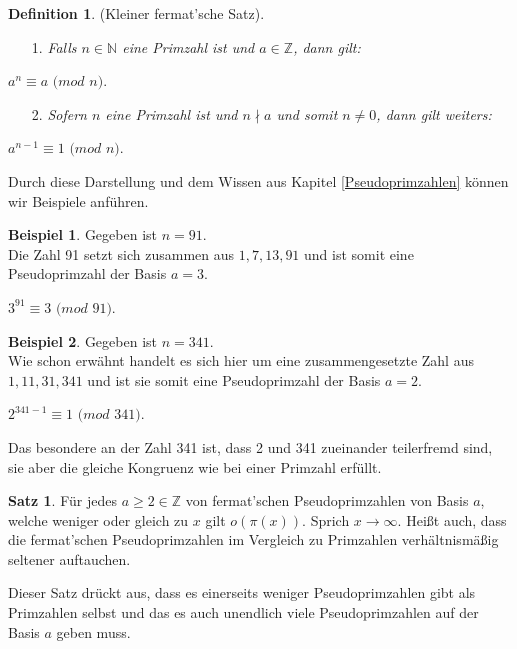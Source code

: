 \documentclass[12pt,a4paper]{article}
\theoremstyle{definition}
\newtheorem{defi}{Definition}[section]
\newtheorem{satz}{Satz}[subsection]
\newtheorem{bsp}{Beispiel}[subsection]
\begin{document}
\newpage
\begin{defi}(Kleiner fermat'sche Satz). \label{Kleiner fermat'sche Satz}
\begin{enumerate}
    \item[1.]\textit{Falls $n \in \mathbb{N}$ eine Primzahl ist und $a \in \mathbb{Z}$, dann gilt:}\end{enumerate}
\begin{center}
$a^{n} \equiv a$ $(mod$ $n)$.
\end{center}
\begin{enumerate}
    \item[2.]\textit{Sofern $n$ eine Primzahl ist und $n \nmid a$ und somit $n \neq 0$, dann gilt weiters:}\end{enumerate}
\begin{center}
$a^{n-1} \equiv 1$ $(mod$ $n)$.
\end{center}\end{defi}

Durch diese Darstellung und dem Wissen aus Kapitel \ref{Pseudoprimzahlen} können wir Beispiele anführen.

\begin{bsp} Gegeben ist $n = 91$.\\
Die Zahl 91 setzt sich zusammen aus $1, 7, 13, 91$ und ist somit eine Pseudoprimzahl der Basis $a = 3$.
\begin{center}
$3^{91} \equiv 3$ $(mod$ $91)$.
\end{center}\end{bsp}
\begin{bsp} Gegeben ist $n = 341$.\\
Wie schon erwähnt handelt es sich hier um eine zusammengesetzte Zahl aus $1, 11, 31, 341$ und ist sie somit eine Pseudoprimzahl der Basis $a = 2$.
\begin{center}
$2^{341-1} \equiv 1$ $(mod$ $341)$.
\end{center}\end{bsp}
Das besondere an der Zahl 341 ist, dass 2 und 341 zueinander teilerfremd sind, sie aber die gleiche Kongruenz wie bei einer Primzahl erfüllt.

\begin{satz}
Für jedes $a \geq 2 \in \mathbb{Z}$ von fermat'schen Pseudoprimzahlen von Basis $a$, welche weniger oder gleich zu $x$ gilt $o(\pi(x))$.
Sprich $x \rightarrow \infty$.
Heißt auch, dass die fermat'schen Pseudoprimzahlen im Vergleich zu Primzahlen verhältnismäßig seltener auftauchen.
\end{satz}
Dieser Satz drückt aus, dass es einerseits weniger Pseudoprimzahlen gibt als Primzahlen selbst und das es auch unendlich viele Pseudoprimzahlen auf der Basis $a$ geben muss.
\end{document}
